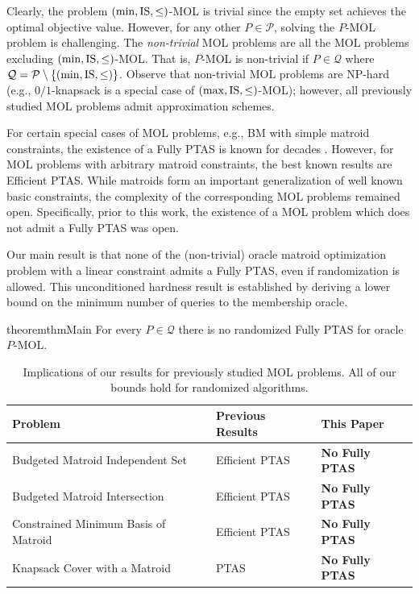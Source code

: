 \documentclass[11pt,letter]{article}
\newcommand{\IS}{\textnormal{IS}}
\newcommand{\cQ}{{\mathcal{Q}}}
\newcommand{\cP}{{\mathcal{P}}}
\begin{document}
Clearly, the problem $(\min,\IS,\leq)$-MOL is trivial since the empty set achieves the optimal objective value. 
However, for any other $P \in \cP$, solving the $P$-MOL problem is challenging.
The {\em non-trivial} MOL problems are all the MOL problems excluding $(\min,\IS,\leq)$-MOL. That is, $P$-MOL is non-trivial if $P\in \cQ$ where  $\cQ = \cP \setminus \{(\min,\IS,\leq)\}$.
 Observe that non-trivial MOL problems are NP-hard (e.g., $0/1${\sc-knapsack} is a special case of $(\max,\IS,\leq)$-MOL);
however, %
all previously studied MOL problems admit approximation schemes.




For certain special cases of MOL problems, e.g., BM with simple matroid constraints,
the existence of a Fully PTAS is known for decades \cite{Si79,caprara2000approximation}.
However, for MOL problems with arbitrary matroid constraints, the best known results are Efficient PTAS.  While matroids form an important generalization of well known basic
constraints,
the complexity of the corresponding MOL problems remained open. Specifically, prior to this work, the existence of a MOL problem which does not admit a Fully PTAS was open.





Our main result is that none of the (non-trivial) 
oracle matroid optimization problem with a linear constraint admits 
a Fully PTAS, even if randomization is allowed. This unconditioned hardness result is established by deriving a lower bound on the minimum number of queries to the membership oracle. 
 \begin{restatable}{theorem}{thmMain}
	\label{thm:main}
	For every $P \in \cQ$ there is no randomized  \textnormal{Fully PTAS} for oracle $P$-\textnormal{MOL}. 
\end{restatable} 

\begin{table}[tbh]
	\centering
	\begin{tabular}{m{2.7in} m{1.4in} m{1.9in}}
		\toprule
		Problem & Previous Results & This Paper \\
		\midrule
		Budgeted Matroid Independent Set & Efficient PTAS \cite{DKS23} & {\bf No Fully PTAS} \\
		Budgeted Matroid Intersection & Efficient PTAS  \cite{DKS23b} & {\bf No Fully PTAS}  \\
		Constrained Minimum Basis of Matroid & Efficient PTAS  \cite{HL04} & {\bf No Fully PTAS} \\
		Knapsack Cover with a Matroid & PTAS \cite{CCNR13} & {\bf No Fully PTAS}  \\
		\bottomrule
	\end{tabular}
	\caption{Implications of our results for previously studied MOL problems. All of our bounds hold for randomized algorithms. }
	\label{tab:results}
\end{table}
\end{document}
